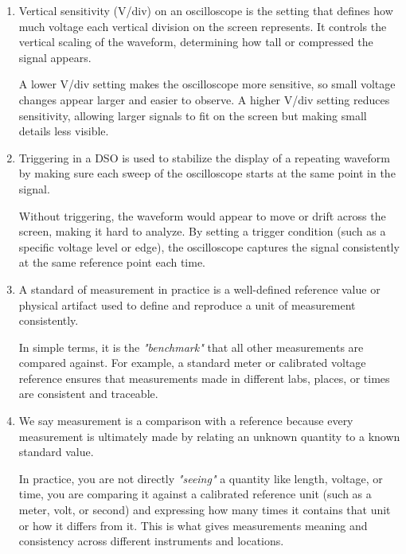 \documentclass[../main.tex]{subfiles}
\begin{document}
\begin{enumerate}[label=\textbf{\arabic*.}]
	If you set a larger time/div (slower timebase), you zoom out and can observe longer periods of the signal, but fine details may become harder to see.

	So, time/div directly affects whether you see a detailed close-up of the waveform or a broader overview of its behavior over time.

	\item Vertical sensitivity (V/div) on an oscilloscope is the setting that defines how much voltage each vertical division on the screen represents. It controls the vertical scaling of the waveform, determining how tall or compressed the signal appears.

	A lower V/div setting makes the oscilloscope more sensitive, so small voltage changes appear larger and easier to observe. A higher V/div setting reduces sensitivity, allowing larger signals to fit on the screen but making small details less visible.

	\item Triggering in a DSO is used to stabilize the display of a repeating waveform by making sure each sweep of the oscilloscope starts at the same point in the signal.

	Without triggering, the waveform would appear to move or drift across the screen, making it hard to analyze. By setting a trigger condition (such as a specific voltage level or edge), the oscilloscope captures the signal consistently at the same reference point each time.
	
	\item A standard of measurement in practice is a well-defined reference value or physical artifact used to define and reproduce a unit of measurement consistently.

	In simple terms, it is the \textit{"benchmark"} that all other measurements are compared against. For example, a standard meter or calibrated voltage reference ensures that measurements made in different labs, places, or times are consistent and traceable.


	\item We say measurement is a comparison with a reference because every measurement is ultimately made by relating an unknown quantity to a known standard value.

	In practice, you are not directly \textit{"seeing"} a quantity like length, voltage, or time, you are comparing it against a calibrated reference unit (such as a meter, volt, or second) and expressing how many times it contains that unit or how it differs from it. This is what gives measurements meaning and consistency across different instruments and locations.


\end{enumerate}
\end{document}
